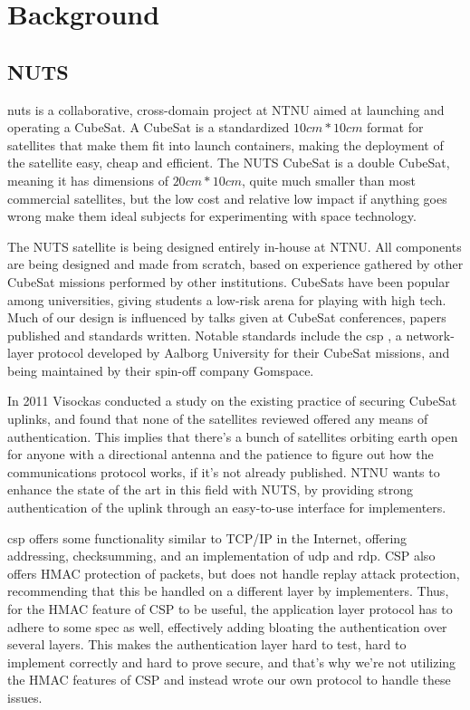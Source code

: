 \chapter{Background}
\label{chp:background}

\section{NUTS}\label{sec:nuts}

\acrfull{nuts} is a collaborative, cross-domain project at NTNU aimed at launching and operating a CubeSat. A CubeSat is a standardized \(10 cm * 10 cm\) format for satellites that make them fit into launch containers, making the deployment of the satellite easy, cheap and efficient. The NUTS CubeSat is a double CubeSat, meaning it has dimensions of \(20 cm * 10 cm\), quite much smaller than most commercial satellites, but the low cost and relative low impact if anything goes wrong make them ideal subjects for experimenting with space technology.

The NUTS satellite is being designed entirely in-house at NTNU. All components are being designed and made from scratch, based on experience gathered by other CubeSat missions performed by other institutions. CubeSats have been popular among universities, giving students a low-risk arena for playing with high tech. Much of our design is influenced by talks given at CubeSat conferences, papers published and standards written. Notable standards include the \gls{csp} \cite{csp}, a network-layer protocol developed by Aalborg University for their CubeSat missions, and being maintained by their spin-off company Gomspace.

In 2011 Visockas \cite{visockas} conducted a study on the existing practice of securing CubeSat uplinks, and found that none of the satellites reviewed offered any means of authentication. This implies that there's a bunch of satellites orbiting earth open for anyone with a directional antenna and the patience to figure out how the communications protocol works, if it's not already published. NTNU wants to enhance the state of the art in this field with NUTS, by providing strong authentication of the uplink through an easy-to-use interface for implementers.

\gls{csp} offers some functionality similar to TCP/IP in the Internet, offering addressing, checksumming, and an implementation of \gls{udp} and \gls{rdp}. CSP also offers HMAC protection of packets, but does not handle replay attack protection, recommending that this be handled on a different layer by implementers. Thus, for the HMAC feature of CSP to be useful, the application layer protocol has to adhere to some spec as well, effectively adding bloating the authentication over several layers. This makes the authentication layer hard to test, hard to implement correctly and hard to prove secure, and that's why we're not utilizing the HMAC features of CSP and instead wrote our own protocol to handle these issues.

